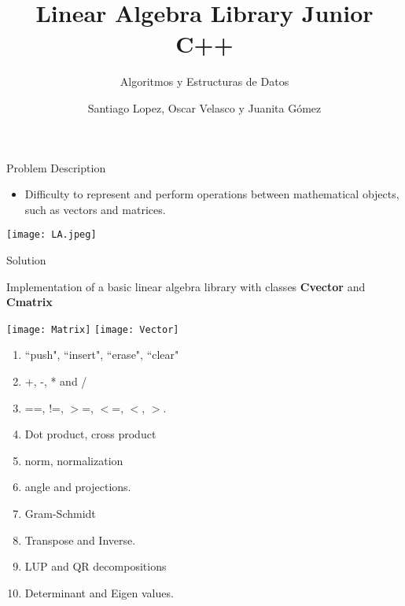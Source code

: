 \documentclass[10pt]{beamer}
\title{Linear Algebra Library Junior C++ }
\subtitle{Algoritmos y Estructuras de Datos}
\author{Santiago Lopez, Oscar Velasco y Juanita Gómez}
\begin{document}
{\1
\begin{frame}
  \titlepage 
\end{frame}}
\begin{frame}{Problem Description}
\begin{itemize}
\item Difficulty to represent and perform operations between mathematical objects, such as vectors and  matrices. 

\end{itemize}
\center \texttt{[image: LA.jpeg]}
\end{frame}

\begin{frame}{Solution}
\begin{block}{}
Implementation of a basic linear algebra library with classes \textbf{Cvector} and \textbf{Cmatrix}
\end{block}
\begin{multicols}{2}
\center
\texttt{[image: Matrix]}
\center
\texttt{[image: Vector]}
\end{multicols}

\begin{multicols}{2}
\begin{enumerate}
    \item``push", ``insert", ``erase", ``clear"   
    \item  +, -, * and /
    \item ==, !=, $>$=, $<$=, $<$, $>$.
    \item Dot product, cross product
    \item norm, normalization
    \item angle and projections.
    \item Gram-Schmidt
    \item Transpose and Inverse.
    \item LUP and QR decompositions
    \item Determinant and Eigen values.
\end{enumerate}
\end{multicols}
\end{frame}
\end{document}
